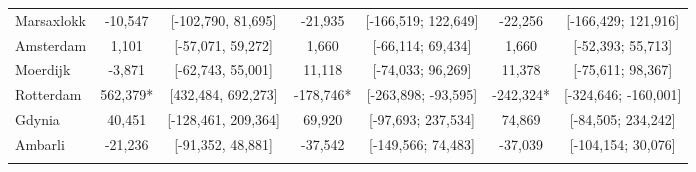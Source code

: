 \begin{table}[ht]
\begin{adjustbox}{max width=\textwidth}
\begin{tabular}{lcccccc}
  Marsaxlokk & -10,547 & [-102,790, 81,695] &  -21,935 & [-166,519; 122,649] &  -22,256 & [-166,429; 121,916] \\ 
  Amsterdam &   1,101 & [-57,071, 59,272] &    1,660 & [-66,114; 69,434] &    1,660 & [-52,393; 55,713] \\ 
  Moerdijk &  -3,871 & [-62,743, 55,001] &   11,118 & [-74,033; 96,269] &   11,378 & [-75,611; 98,367] \\ 
  Rotterdam & 562,379* & [432,484, 692,273] & -178,746* & [-263,898; -93,595] & -242,324* & [-324,646; -160,001] \\ 
  Gdynia &  40,451 & [-128,461, 209,364] &   69,920 & [-97,693; 237,534] &   74,869 & [-84,505; 234,242] \\ 
  Ambarli & -21,236 & [-91,352, 48,881] &  -37,542 & [-149,566; 74,483] &  -37,039 & [-104,154; 30,076] \\ 
   [2ex] \hline \hline {}\end{tabular} 
 \end{adjustbox}
\endgroup
\end{table}
